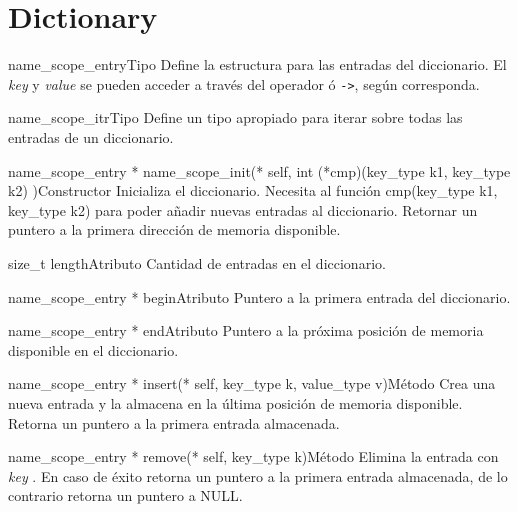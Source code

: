 \section{Dictionary}

\begin{apientry}{name\_scope\_entry}{Tipo}
    Define la estructura para las entradas del diccionario. El \emph{key} y \emph{value} se pueden acceder a través del operador  ó \verb;->;, según corresponda. 
\end{apientry}

\begin{apientry}{name\_scope\_itr}{Tipo}
   Define un tipo apropiado para iterar sobre todas las entradas de un diccionario. 
\end{apientry}

\begin{apientry}{name\_scope\_entry * name\_scope\_init(* self, int (*cmp)(key\_type k1, key\_type k2) )}{Constructor}
    Inicializa el diccionario. Necesita al función cmp(key\_type k1, key\_type k2) para poder añadir nuevas entradas al diccionario. Retornar un puntero a la primera dirección de memoria disponible.\end{apientry}

\begin{apientry}{size\_t length}{Atributo}
    Cantidad de entradas en el diccionario.
\end{apientry}

\begin{apientry}{name\_scope\_entry * begin}{Atributo}
    Puntero a la primera entrada del diccionario.
\end{apientry}

\begin{apientry}{name\_scope\_entry * end}{Atributo}
    Puntero a la próxima posición de memoria disponible en el diccionario. 
\end{apientry}

\begin{apientry}{name\_scope\_entry * insert(* self, key\_type k, value\_type v)}{Método}
    Crea una nueva entrada y la almacena en la última posición de memoria disponible. Retorna un puntero a la primera entrada almacenada.
\end{apientry}

\begin{apientry}{name\_scope\_entry * remove(* self, key\_type k)}{Método}
    Elimina la entrada con \emph{key} . En caso de éxito retorna un puntero a la primera entrada almacenada, de lo contrario retorna un puntero a NULL.
\end{apientry}

